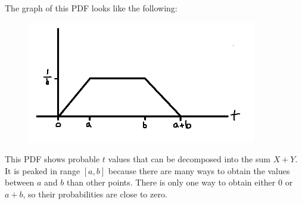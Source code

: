 \begin{texample}
	The graph of this PDF looks like the following:
	
	\begin{figure}[H]
		\centering
		\includegraphics[width=100mm]{28.png}
	\end{figure}
	
	This PDF shows probable $t$ values that can be decomposed into the sum $X+Y$. It is peaked in range $[a,b]$ because there are many ways to obtain the values between $a$ and $b$ than other points. There is only one way to obtain either $0$ or $a+b$, so their probabilities are close to zero.
\end{texample}

